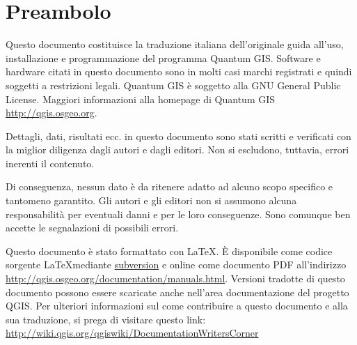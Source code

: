 
\newcommand\qgistip[1]{\raggedright\small{#1}}
\renewcommand{\topfraction}{0.85}
\renewcommand{\textfraction}{0.1}
\renewcommand{\floatpagefraction}{0.75}
\thispagestyle{empty}


\section*{Preambolo}


\vspace{1cm}



Questo documento costituisce la traduzione italiana dell'originale
guida all'uso, installazione e programmazione del programma Quantum
GIS. Software e hardware citati in questo documento sono in
molti casi marchi registrati e quindi soggetti a restrizioni
legali. Quantum GIS è soggetto alla GNU General Public License. Maggiori
informazioni alla homepage di Quantum GIS
\url{http://qgis.osgeo.org}.

Dettagli, dati, risultati ecc. in questo documento sono stati
scritti e verificati con la miglior diligenza dagli autori
e dagli editori. Non si escludono, tuttavia, errori inerenti il contenuto.

Di conseguenza, nessun dato è da ritenere adatto ad alcuno scopo specifico
e tantomeno garantito. Gli autori e gli editori non si assumono alcuna responsabilità per eventuali
danni e per le loro conseguenze. Sono comunque ben accette le segnalazioni
di possibili errori.

Questo documento è stato formattato con \LaTeX. È disponibile come codice
sorgente \LaTeX mediante \href{http://wiki.qgis.org/qgiswiki/DocumentationWritersCorner}{subversion} e online come documento PDF all'indirizzo \url{http://qgis.osgeo.org/documentation/manuals.html}.
Versioni tradotte di questo documento possono essere scaricate anche nell'area documentazione del progetto QGIS. Per ulteriori informazioni sul come contribuire a questo documento e alla sua traduzione, si prega di visitare questo link:
\url{http://wiki.qgis.org/qgiswiki/DocumentationWritersCorner}

